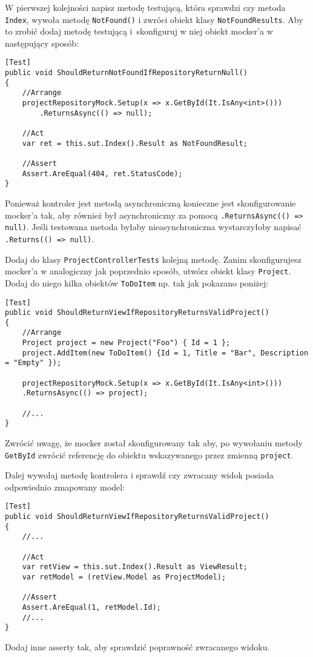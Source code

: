 W pierwszej kolejności napisz metodę testującą, która sprawdzi czy metoda \texttt{Index}, wywoła metodę \texttt{NotFound()} i zwróci obiekt klasy \texttt{NotFoundResults}. Aby to zrobić dodaj metodę testującą i~skonfiguruj w niej obiekt mocker'a w następujący sposób:
\begin{lstlisting}
[Test]
public void ShouldReturnNotFoundIfRepositoryReturnNull()
{
	//Arrange
	projectRepositoryMock.Setup(x => x.GetById(It.IsAny<int>()))
		.ReturnsAsync(() => null);
	
	//Act
	var ret = this.sut.Index().Result as NotFoundResult;
	
	//Assert
	Assert.AreEqual(404, ret.StatusCode);
}
\end{lstlisting}
Ponieważ kontroler jest metodą asynchroniczną konieczne jest skonfigurowanie mocker'a tak, aby również był asynchroniczny za pomocą \texttt{.ReturnsAsync(() => null)}. Jeśli testowana metoda byłaby nieasynchroniczna wystarczyłoby napisać \texttt{.Returns(() => null)}.

Dodaj do klasy \texttt{ProjectControllerTests} kolejną metodę. Zanim skonfigurujesz mocker'a w analogiczny jak poprzednio sposób, utwórz obiekt klasy \texttt{Project}. Dodaj do niego kilka obiektów \texttt{ToDoItem} np. tak jak pokazano poniżej:
\begin{lstlisting}
[Test]
public void ShouldReturnViewIfRepositoryReturnsValidProject()
{
	//Arrange
	Project project = new Project("Foo") { Id = 1 };
	project.AddItem(new ToDoItem() {Id = 1, Title = "Bar", Description = "Empty" });
	
	projectRepositoryMock.Setup(x => x.GetById(It.IsAny<int>()))
	.ReturnsAsync(() => project);
	
	//...
}
\end{lstlisting}
Zwrócić uwagę, że mocker został skonfigurowany tak aby, po wywołaniu metody \texttt{GetById} zwrócić referencję do obiektu wskazywanego przez zmienną \texttt{project}.

Dalej wywołaj metodę kontrolera i sprawdź czy zwracany widok posiada odpowiednio zmapowany model:
\begin{lstlisting}
[Test]
public void ShouldReturnViewIfRepositoryReturnsValidProject()
{
	//...
	
	//Act
	var retView = this.sut.Index().Result as ViewResult;
	var retModel = (retView.Model as ProjectModel);
	
	//Assert
	Assert.AreEqual(1, retModel.Id);
	//...
}
\end{lstlisting}
Dodaj inne asserty tak, aby sprawdzić poprawność zwracanego widoku.


